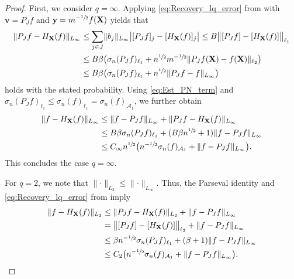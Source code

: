 \documentclass[10pt,a4paper]{amsart}
\begin{document}
\begin{proof}
First, we consider $q=\infty$.
Applying \eqref{eq:Recovery_lq_error} from  with $\mathbf{v} = P_Jf$ and $\mathbf{y} = m^{-\sfrac{1}{2}}f(\mathbf{X})$ yields that
\begin{align}\label{eq:Est_PN_term}
\begin{split}
    \lVert P_Jf - H_{\mathbf{X}}(f) \rVert_{L_\infty} &\leq \sum_{j\in J} \lVert b_j\rVert_{L_\infty} \big\lvert[P_Jf]_j - [H_{\mathbf{X}}(f)]_j \big\rvert \leq B \big\lVert[P_Jf] - [H_{\mathbf{X}} (f)]\big\rVert_{\ell_1}\\
    &\leq B\beta\big(\sigma_n(P_Jf)_{\ell_1} + n^{\sfrac{1}{2}} m^{-\sfrac{1}{2}} \lVert P_Jf(\mathbf{X}) - f(\mathbf{X})\rVert_{\ell_2}\big)\\
    &\leq B\beta\big(\sigma_n(P_Jf)_{\ell_1} + n^{\sfrac{1}{2}} \lVert P_Jf - f\rVert_{L_\infty}\big)
\end{split}
\end{align}
holds with the stated probability. Using \eqref{eq:Est_PN_term} and $ \sigma_n(P_Jf)_{\ell_1} \leq \sigma_n(f)_{\ell_1} = \sigma_n(f)_{\mathcal{A}_1}$, we further obtain
\begin{align}
\begin{split}
    \lVert f - H_{\mathbf{X}}(f)\rVert_{L_\infty} & \leq \lVert f - P_Jf \rVert_{L_\infty} + \lVert P_Jf - H_{\mathbf{X}}(f) \rVert_{L_\infty}\\
    &\leq B \beta \sigma_n(P_Jf)_{\ell_1} + (B\beta n^{\sfrac{1}{2}}+1)\lVert f - P_Jf\rVert_{L_\infty}\\
    &\leq C_{\infty} n^{\sfrac{1}{2}} \bigl(n^{-\sfrac{1}{2}}\sigma_n(f)_{\mathcal{A}_1} + \lVert f-P_Jf\rVert_{L_\infty} \bigr).
\end{split}
\end{align}
This concludes the case $q =\infty$.

For $q = 2$, we note that $\lVert\cdot\rVert_{L_2}\leq \lVert\cdot\rVert_{L_\infty}$.
Thus, the Parseval identity and \eqref{eq:Recovery_lq_error} from  imply
\begin{align}
\begin{split}
    \lVert f - H_{\mathbf{X}}(f)\rVert_{L_2} & \leq \lVert P_Jf -  H_{\mathbf{X}}(f)\rVert_{L_2} + \lVert f -P_Jf \rVert_{L_\infty}\\
    & = \bigl\lVert [P_Jf] - [H_{\mathbf{X}}(f)]\bigr\rVert_{\ell_2} + \lVert f - P_Jf \rVert_{L_\infty}\\
    &\leq \beta n^{-\sfrac{1}{2}}\sigma_n(P_Jf)_{\ell_1} + (\beta+1) \lVert f - P_Jf\rVert_{L_\infty}\\
    & \leq C_2 \big( n^{-\sfrac{1}{2}} \sigma_n(f)_{\mathcal{A}_1} + \lVert f-P_Jf\rVert_{L_\infty} \big).
\end{split}
\end{align}


\end{proof}
\end{document}
